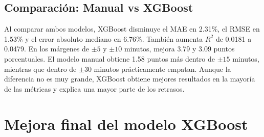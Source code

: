 \documentclass[a4paper,12pt,twocolumn]{report}
\begin{document}
\subsection{Comparación: Manual vs XGBoost}

\begin{table}[h!]
	\centering
	\small
	\caption{Comparación de los modelos sobre el conjunto de prueba.}
	\label{tab:final-comparison}
\end{table}

Al comparar ambos modelos, XGBoost disminuye el MAE en 2.31\%, el RMSE en 1.53\% y el error absoluto mediano en 6.76\%. También aumenta $R^2$ de 0.0181 a 0.0479. En los márgenes de $\pm5$ y $\pm10$ minutos, mejora 3.79 y 3.09 puntos porcentuales. El modelo manual obtiene 1.58 puntos más dentro de $\pm15$ minutos, mientras que dentro de $\pm30$ minutos prácticamente empatan. Aunque la diferencia no es muy grande, XGBoost obtiene mejores resultados en la mayoría de las métricas y explica una mayor parte de los retrasos.

\section{Mejora final del modelo XGBoost}
\label{sec:xgboost-mejorado}
\end{document}
